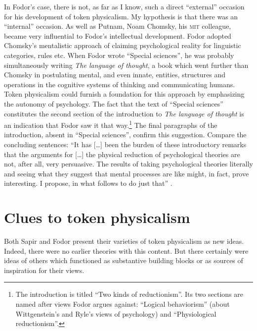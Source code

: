 \documentclass[output=paper]{langscibook}
\begin{document}
In Fodor's case, there is not, as far as I know, such a direct ``external'' occasion for his development of token physicalism. My hypothesis is that there was an ``internal'' occasion. As well as Putnam, Noam Chomsky, his \textsc{mit} colleague, became very influential to Fodor's intellectual development. Fodor adopted Chomsky's mentalistic approach of claiming psychological reality for linguistic categories, rules etc. When Fodor wrote ``Special sciences'', he was probably simultaneously writing \emph{The language of thought}, a book which went further than Chomsky in postulating mental, and even innate, entities, structures and operations in the cognitive systems of thinking and communicating humans. Token physicalism could furnish a foundation for this approach by emphasizing the autonomy of psychology. The fact that the text of ``Special sciences'' constitutes the second section of the introduction to \emph{The language of thought} is an indication that Fodor saw it that way.\footnote{The introduction is titled ``Two kinds of reductionism''. Its two sections are named after views Fodor argues against: ``Logical behaviorism'' (about Wittgenstein's and Ryle's views of psychology) and ``Physiological reductionism''.} The final paragraphs of the introduction, absent in ``Special sciences'', confirm this suggestion. Compare the concluding sentences: ``It has […] been the burden of these introductory remarks that the arguments for […] the physical reduction of psychological theories are not, after all, very persuasive. The results of taking psychological theories literally and seeing what they suggest that mental processes are like might, in fact, prove interesting. I propose, in what follows to do just that'' \citep[26]{Fodor1975}.

\section{Clues to token physicalism}
\label{sec:elffers:clues}

Both Sapir and Fodor present their varieties of token physicalism as new ideas. Indeed, there were no earlier theories with this content. But there certainly were ideas of others which functioned as substantive building blocks or as sources of inspiration for their views.
\end{document}
